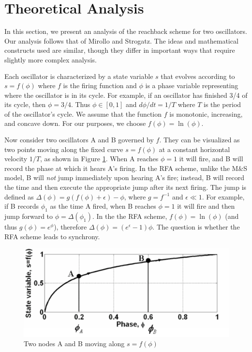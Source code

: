 \section{Theoretical Analysis}
\label{sec-theory}

In this section, we present an analysis of the reachback scheme for
two oscillators. Our analysis follows that of Mirollo and
Strogatz. The ideas and mathematical constructs used are similar,
though they differ in important ways that require slightly more
complex analysis.

Each oscillator is characterized by a state variable $s$ that evolves
according to $s=f(\phi)$ where $f$ is the firing function and $\phi$
is a phase variable representing where the oscillator is in its
cycle. For example, if an oscillator has finished 3/4 of its cycle,
then $\phi=3/4$. Thus $\phi\in[0,1]$ and $d\phi/dt=1/T$ where $T$ is
the period of the oscillator's cycle. We assume that the function $f$
is monotonic, increasing, and concave down. For our purposes, we
choose $f(\phi)=\ln(\phi)$.

Now consider two oscillators A and B governed by $f$. They can be
visualized as two points moving along the fixed curve $s=f(\phi)$ at a
constant horizontal velocity $1/T$, as shown in Figure
\ref{fig:theory2}. When A reaches $\phi=1$ it will fire, and B will
record the phase at which it hears A's firing. In the RFA scheme,
unlike the M\&S model, B will \emph{not} jump immediately upon hearing
A's fire; instead, B will record the time and then execute the
appropriate jump after its next firing. The jump is defined as
$\Delta(\phi)=g(f(\phi)+\epsilon)-\phi$, where $g=f^{-1}$ and
$\epsilon \ll 1$. For example, if B records $\phi_1$ as the time A
fired, when B reaches $\phi=1$ it will fire and then jump forward to
$\phi=\Delta(\phi_1)$. In the the RFA scheme, $f(\phi) = \ln(\phi)$
(and thus $g(\phi)=e^{\phi}$), therefore
$\Delta(\phi)=(e^{\epsilon}-1)\phi$. The question is whether the RFA
scheme leads to synchrony.

\begin{figure}[t]
\begin{center}
\includegraphics[width=1.0\hsize]{./figures/theory-2oscillators.pdf}
\end{center}
\caption{Two nodes A and B moving along $s=f(\phi)$}
\label{fig:theory2}
\end{figure}

